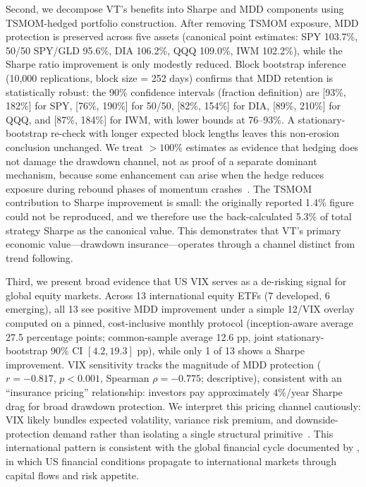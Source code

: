 Second, we decompose VT's benefits into Sharpe and MDD components using TSMOM-hedged portfolio construction. After removing TSMOM exposure, MDD protection is preserved across five assets (canonical point estimates: SPY 103.7\%, 50/50 SPY/GLD 95.6\%, DIA 106.2\%, QQQ 109.0\%, IWM 102.2\%), while the Sharpe ratio improvement is only modestly reduced. Block bootstrap inference (10,000 replications, block size = 252 days) confirms that MDD retention is statistically robust: the 90\% confidence intervals (fraction definition) are [93\%, 182\%] for SPY, [76\%, 190\%] for 50/50, [82\%, 154\%] for DIA, [89\%, 210\%] for QQQ, and [87\%, 184\%] for IWM, with lower bounds at 76--93\%. A stationary-bootstrap re-check with longer expected block lengths leaves this non-erosion conclusion unchanged. We treat $>100\%$ estimates as evidence that hedging does not damage the drawdown channel, not as proof of a separate dominant mechanism, because some enhancement can arise when the hedge reduces exposure during rebound phases of momentum crashes~\citep{daniel2016}. The TSMOM contribution to Sharpe improvement is small: the originally reported 1.4\% figure could not be reproduced, and we therefore use the back-calculated 5.3\% of total strategy Sharpe as the canonical value. This demonstrates that VT's primary economic value---drawdown insurance---operates through a channel distinct from trend following.

Third, we present broad evidence that US VIX serves as a de-risking signal for global equity markets. Across 13 international equity ETFs (7 developed, 6 emerging), all 13 see positive MDD improvement under a simple 12/VIX overlay computed on a pinned, cost-inclusive monthly protocol (inception-aware average 27.5 percentage points; common-sample average 12.6 pp, joint stationary-bootstrap 90\% CI $[4.2, 19.3]$ pp), while only 1 of 13 shows a Sharpe improvement. VIX sensitivity tracks the magnitude of MDD protection ($r = -0.817$, $p < 0.001$, Spearman $\rho = -0.775$; descriptive), consistent with an ``insurance pricing'' relationship: investors pay approximately $4\%$/year Sharpe drag for broad drawdown protection. We interpret this pricing channel cautiously: VIX likely bundles expected volatility, variance risk premium, and downside-protection demand rather than isolating a single structural primitive~\citep{bollerslev2009, bondarenko2019}. This international pattern is consistent with the global financial cycle documented by \citet{miranda2020}, in which US financial conditions propagate to international markets through capital flows and risk appetite.

